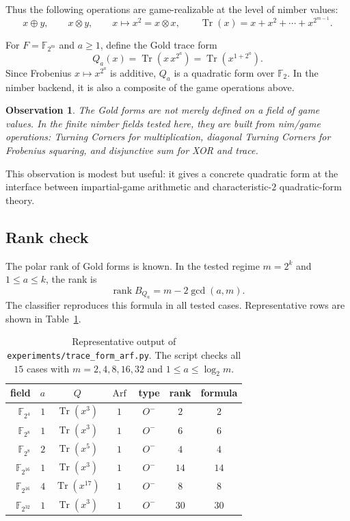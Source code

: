 \documentclass[11pt]{article}
\newtheorem{observation}{Observation}
\theoremstyle{definition}
\newcommand{\F}{\mathbb{F}}
\newcommand{\Tr}{\operatorname{Tr}}
\newcommand{\Arf}{\operatorname{Arf}}
\newcommand{\nimmul}{\otimes}
\begin{document}
Thus the following operations are game-realizable at the level of nimber
values:
\[
  x\oplus y,\qquad x\nimmul y,\qquad x\mapsto x^2=x\nimmul x,\qquad
  \Tr(x)=x+x^2+\cdots+x^{2^{m-1}}.
\]

For $F=\F_{2^m}$ and $a\geq 1$, define the Gold trace form
\[
  Q_a(x)=\Tr\!\left(x\,x^{2^a}\right)=\Tr\!\left(x^{1+2^a}\right).
\]
Since Frobenius $x\mapsto x^{2^a}$ is additive, $Q_a$ is a quadratic form over
$\F_2$. In the nimber backend, it is also a composite of the game operations
above.

\begin{observation}\label{obs:built}
The Gold forms are not merely defined on a field of game values. In the finite
nimber fields tested here, they are built from nim/game operations: Turning
Corners for multiplication, diagonal Turning Corners for Frobenius squaring,
and disjunctive sum for XOR and trace.
\end{observation}

This observation is modest but useful: it gives a concrete quadratic form at
the interface between impartial-game arithmetic and characteristic-$2$
quadratic-form theory.

\subsection{Rank check}

The polar rank of Gold forms is known. In the tested regime
$m=2^k$ and $1\leq a\leq k$, the rank is
\[
  \operatorname{rank} B_{Q_a}=m-2\gcd(a,m).
\]
The classifier reproduces this formula in all tested cases. Representative
rows are shown in Table~\ref{tab:gold}.

\begin{table}[h]
\centering
\begin{tabular}{rrccccc}
\toprule
field & $a$ & $Q$ & $\Arf$ & type & rank & formula \\
\midrule
$\F_{2^{4}}$  & $1$ & $\Tr(x^3)$    & $1$ & $O^-$ & $2$  & $2$ \\
$\F_{2^{8}}$  & $1$ & $\Tr(x^3)$    & $1$ & $O^-$ & $6$  & $6$ \\
$\F_{2^{8}}$  & $2$ & $\Tr(x^5)$    & $1$ & $O^-$ & $4$  & $4$ \\
$\F_{2^{16}}$ & $1$ & $\Tr(x^3)$    & $1$ & $O^-$ & $14$ & $14$ \\
$\F_{2^{16}}$ & $4$ & $\Tr(x^{17})$ & $1$ & $O^-$ & $8$  & $8$ \\
$\F_{2^{32}}$ & $1$ & $\Tr(x^3)$    & $1$ & $O^-$ & $30$ & $30$ \\
\bottomrule
\end{tabular}
\caption{Representative output of \texttt{experiments/trace\_form\_arf.py}.
The script checks all $15$ cases with $m=2,4,8,16,32$ and
$1\leq a\leq \log_2 m$.}
\label{tab:gold}
\end{table}
\end{document}
